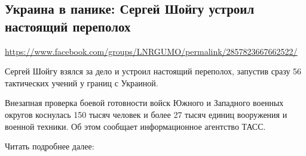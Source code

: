  
 
\subsection{Украина в панике: Сергей Шойгу устроил настоящий переполох}
\label{sec:19_07_2020.fb.lnr.15}
\url{https://www.facebook.com/groups/LNRGUMO/permalink/2857823667662522/}
  
Сергей Шойгу взялся за дело и устроил настоящий переполох, запустив сразу 56
тактических учений у границ с Украиной.


Внезапная проверка боевой готовности войск Южного и Западного военных округов
коснулась 150 тысяч человек и более 27 тысяч единиц вооружения и военной
техники. Об этом сообщает информационное агентство ТАСС.

Читать подробнее далее: 
